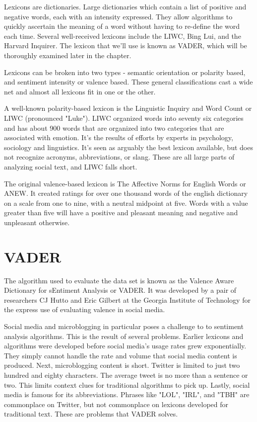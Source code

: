 \documentclass[11pt, twoside, reqno]{book}
\begin{document}
Lexicons are dictionaries. Large dictionaries which contain a list of positive and negative words, each with an intensity expressed. They allow algorithms to quickly ascertain the meaning of a word without having to re-define the word each time. Several well-received lexicons include the LIWC, Bing Lui, and the Harvard Inquirer. The lexicon that we'll use is known as VADER, which will be thoroughly examined later in the chapter. 

Lexicons can be broken into two types - semantic orientation or polarity based, and sentiment intensity or valence based. These general classifications cast a wide net and almost all lexicons fit in one or the other. 

 A well-known polarity-based lexicon is the Linguistic Inquiry and Word Count or LIWC (pronounced "Luke"). LIWC organized words into seventy six categories and has about 900 words that are organized into two categories that are associated with emotion. It's the results of efforts by experts in psychology, sociology and linguistics. It's seen as arguably the best lexicon available, but does not recognize acronyms, abbreviations, or slang. These are all large parts of analyzing social text, and LIWC falls short. 

The original valence-based lexicon is The Affective Norms for English Words or ANEW. It created ratings for over one thousand words of the english dictionary on a scale from one to nine, with a neutral midpoint at five. Words with a value greater than five will have a positive and pleasant meaning and negative and unpleasant otherwise. 

\section{VADER}
\hspace{0.2in}The algorithm used to evaluate the data set is known as the Valence Aware Dictionary for sEntiment Analysis or VADER. It was developed by a pair of researchers CJ Hutto and Eric Gilbert at the Georgia Institute of Technology for the express use of evaluating valence in social media. 

Social media and microblogging in particular poses a challenge to to sentiment analysis algorithms. This is the result of several problems. Earlier lexicons and algorithms were developed before social media's usage rates grew exponentially. They simply cannot handle the rate and volume that social media content is produced. Next, microblogging content is short. Twitter is limited to just two hundred and eighty characters. The average tweet is no more than a sentence or two. This limits context clues for traditional algorithms to pick up. Lastly, social media is famous for its abbreviations. Phrases like "LOL", "IRL", and "TBH" are commonplace on Twitter, but not commonplace on lexicons developed for traditional text. These are problems that VADER solves.
\end{document}
